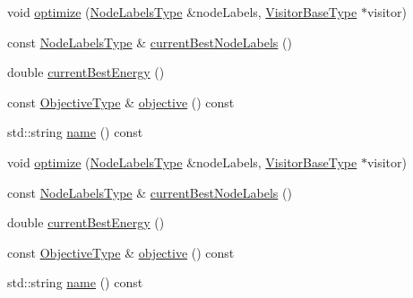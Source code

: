 \begin{DoxyCompactItemize}
\item 
void \hyperlink{classnifty_1_1graph_1_1opt_1_1multicut_1_1PyMulticutBase_a1d937be26c587bd510f434415caa8314}{optimize} (\hyperlink{classnifty_1_1graph_1_1opt_1_1multicut_1_1PyMulticutBase_a34b9d7a58d056154c6b1abe7a83297c6}{Node\+Labels\+Type} \&node\+Labels, \hyperlink{classnifty_1_1graph_1_1opt_1_1multicut_1_1PyMulticutBase_ac1d714affe7c2138ec75b9faad3000f6}{Visitor\+Base\+Type} $\ast$visitor)
\item 
const \hyperlink{classnifty_1_1graph_1_1opt_1_1multicut_1_1PyMulticutBase_a34b9d7a58d056154c6b1abe7a83297c6}{Node\+Labels\+Type} \& \hyperlink{classnifty_1_1graph_1_1opt_1_1multicut_1_1PyMulticutBase_ae55ef699b41926bd799a6d3f048dcf2a}{current\+Best\+Node\+Labels} ()
\item 
double \hyperlink{classnifty_1_1graph_1_1opt_1_1multicut_1_1PyMulticutBase_a0928f8539f5773900cefe88d703c14eb}{current\+Best\+Energy} ()
\item 
const \hyperlink{classnifty_1_1graph_1_1opt_1_1multicut_1_1PyMulticutBase_a434bee3be13abad62cacc5fbc4549cde}{Objective\+Type} \& \hyperlink{classnifty_1_1graph_1_1opt_1_1multicut_1_1PyMulticutBase_a0cad5268fb85b36ab8a73d6f08eeef38}{objective} () const
\item 
std\+::string \hyperlink{classnifty_1_1graph_1_1opt_1_1multicut_1_1PyMulticutBase_a1542fd534762e4bc4c9415848e53e622}{name} () const
\item 
void \hyperlink{classnifty_1_1graph_1_1opt_1_1multicut_1_1PyMulticutBase_a1d937be26c587bd510f434415caa8314}{optimize} (\hyperlink{classnifty_1_1graph_1_1opt_1_1multicut_1_1PyMulticutBase_a34b9d7a58d056154c6b1abe7a83297c6}{Node\+Labels\+Type} \&node\+Labels, \hyperlink{classnifty_1_1graph_1_1opt_1_1multicut_1_1PyMulticutBase_ac1d714affe7c2138ec75b9faad3000f6}{Visitor\+Base\+Type} $\ast$visitor)
\item 
const \hyperlink{classnifty_1_1graph_1_1opt_1_1multicut_1_1PyMulticutBase_a34b9d7a58d056154c6b1abe7a83297c6}{Node\+Labels\+Type} \& \hyperlink{classnifty_1_1graph_1_1opt_1_1multicut_1_1PyMulticutBase_ae55ef699b41926bd799a6d3f048dcf2a}{current\+Best\+Node\+Labels} ()
\item 
double \hyperlink{classnifty_1_1graph_1_1opt_1_1multicut_1_1PyMulticutBase_a0928f8539f5773900cefe88d703c14eb}{current\+Best\+Energy} ()
\item 
const \hyperlink{classnifty_1_1graph_1_1opt_1_1multicut_1_1PyMulticutBase_a434bee3be13abad62cacc5fbc4549cde}{Objective\+Type} \& \hyperlink{classnifty_1_1graph_1_1opt_1_1multicut_1_1PyMulticutBase_a0cad5268fb85b36ab8a73d6f08eeef38}{objective} () const
\item 
std\+::string \hyperlink{classnifty_1_1graph_1_1opt_1_1multicut_1_1PyMulticutBase_a1542fd534762e4bc4c9415848e53e622}{name} () const
\end{DoxyCompactItemize}


